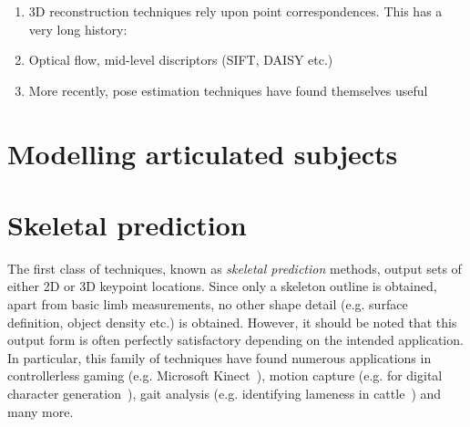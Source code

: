 



\begin{enumerate}
    \item 3D reconstruction techniques rely upon point correspondences. This has a very long history:
    \item Optical flow, mid-level discriptors (SIFT, DAISY etc.)
    \item More recently, pose estimation techniques have found themselves useful 
\end{enumerate}




\section{Modelling articulated subjects}

\section{Skeletal prediction}

The first class of techniques, known as \textit{skeletal prediction} methods, output sets of either 2D or 3D keypoint locations. Since only a skeleton outline is obtained, apart from basic limb measurements, no other shape detail (e.g. surface definition, object density etc.) is obtained. However, it should be noted that this output form is often perfectly satisfactory depending on the intended application. In particular, this family of techniques have found numerous applications in controllerless gaming (e.g. Microsoft Kinect~\cite{kinectpaper}), motion capture (e.g. for digital character generation~\cite{xxx}), gait analysis (e.g. identifying lameness in cattle~\cite{xxx}) and many more. 

